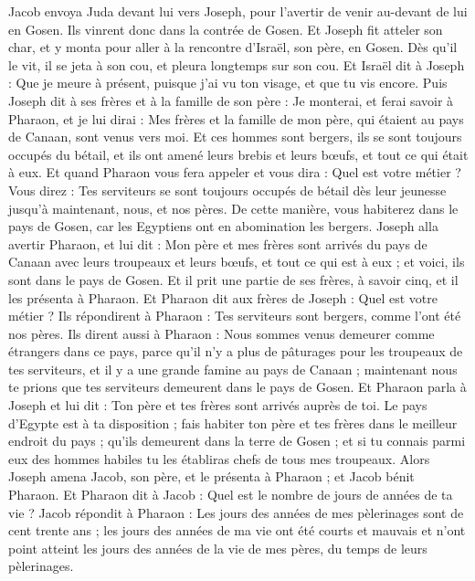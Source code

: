 \begin{multicols}{2}
Jacob envoya Juda devant lui vers Joseph, pour l'avertir de venir au-devant de lui en Gosen. Ils vinrent donc dans la contrée de Gosen.
Et Joseph fit atteler son char, et y monta pour aller à la rencontre d'Israël, son père, en Gosen. Dès qu'il le vit, il se jeta à son cou, et pleura longtemps sur son cou.
Et Israël dit à Joseph : Que je meure à présent, puisque j'ai vu ton visage, et que tu vis encore.
Puis Joseph dit à ses frères et à la famille de son père : Je monterai, et ferai savoir à Pharaon, et je lui dirai : Mes frères et la famille de mon père, qui étaient au pays de Canaan, sont venus vers moi.
Et ces hommes sont bergers, ils se sont toujours occupés du bétail, et ils ont amené leurs brebis et leurs bœufs, et tout ce qui était à eux.
Et quand Pharaon vous fera appeler et vous dira : Quel est votre métier ?
Vous direz : Tes serviteurs se sont toujours occupés de bétail dès leur jeunesse jusqu'à maintenant, nous, et nos pères. De cette manière, vous habiterez dans le pays de Gosen, car les Egyptiens ont en abomination les bergers.
\VerseOne{}Joseph alla avertir Pharaon, et lui dit : Mon père et mes frères sont arrivés du pays de Canaan avec leurs troupeaux et leurs bœufs, et tout ce qui est à eux ; et voici, ils sont dans le pays de Gosen.
Et il prit une partie de ses frères, à savoir cinq, et il les présenta à Pharaon.
Et Pharaon dit aux frères de Joseph : Quel est votre métier ? Ils répondirent à Pharaon : Tes serviteurs sont bergers, comme l'ont été nos pères.
Ils dirent aussi à Pharaon : Nous sommes venus demeurer comme étrangers dans ce pays, parce qu'il n'y a plus de pâturages pour les troupeaux de tes serviteurs, et il y a une grande famine au pays de Canaan ; maintenant nous te prions que tes serviteurs demeurent dans le pays de Gosen.
Et Pharaon parla à Joseph et lui dit : Ton père et tes frères sont arrivés auprès de toi.
Le pays d'Egypte est à ta disposition ; fais habiter ton père et tes frères dans le meilleur endroit du pays ; qu'ils demeurent dans la terre de Gosen ; et si tu connais parmi eux des hommes habiles tu les établiras chefs de tous mes troupeaux.
Alors Joseph amena Jacob, son père, et le présenta à Pharaon ; et Jacob bénit Pharaon.
Et Pharaon dit à Jacob : Quel est le nombre de jours de années de ta vie ?
Jacob répondit à Pharaon : Les jours des années de mes pèlerinages sont de cent trente ans ; les jours des années de ma vie ont été courts et mauvais et n'ont point atteint les jours des années de la vie de mes pères, du temps de leurs pèlerinages.

\end{multicols}
